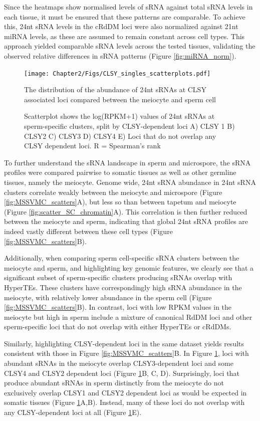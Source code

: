 Since the heatmaps show normalised levels of sRNA against total sRNA levels in each tissue, it must be ensured that these patterns are comparable. To achieve this, 24nt sRNA levels in the cRdDM loci were also normalized against 21nt miRNA levels, as these are assumed to remain constant across cell types. This approach yielded comparable sRNA levels across the tested tissues, validating the observed relative differences in sRNA patterns (Figure \ref{fig:miRNA_norm}).

\begin{figure}[htbp!] 
\centering    
    \texttt{[image: Chapter2/Figs/CLSY\_singles\_scatterplots.pdf]}
\caption{The distribution of the abundance of 24nt sRNAs at CLSY associated loci compared between the meiocyte and sperm cell}
\label{fig:clsysingle_scatters}
\captionsetup{font=small}
    \caption*{Scatterplot shows the log(RPKM+1) values of 24nt sRNAs at sperm-specific clusters, split by CLSY-dependent loci A) CLSY 1 B) CLSY2 C) CLSY3 D) CLSY4 E) Loci that do not overlap any CLSY dependent loci. R = Spearman's rank}
\end{figure}

To further understand the sRNA landscape in sperm and microspore, the sRNA profiles were compared pairwise to somatic tissues as well as other germline tissues, namely the meiocyte. Genome wide, 24nt sRNA abundance in 24nt sRNA clusters correlate weakly between the meiocyte and microspore (Figure \ref{fig:MSSVMC_scatters}A), but less so than between tapetum and meiocyte (Figure \ref{fig:scatter_SC_chromatin}A). This correlation is then further reduced between the meiocyte and sperm, indicating that global 24nt sRNA profiles are indeed vastly different between these cell types (Figure \ref{fig:MSSVMC_scatters}B).

Additionally, when comparing sperm cell-specific sRNA clusters between the meiocyte and sperm, and highlighting key genomic features, we clearly see that a significant subset of sperm-specific clusters producing sRNAs overlap with HyperTEs. These clusters have correspondingly high sRNA abundance in the meiocyte, with relatively lower abundance in the sperm cell (Figure \ref{fig:MSSVMC_scatters}B). In contrast, loci with low RPKM values in the meiocyte but high in sperm include a mixture of canonical RdDM loci and other sperm-specific loci that do not overlap with either HyperTEs or cRdDMs.

Similarly, highlighting CLSY-dependent loci in the same dataset  yields results consistent with those in Figure \ref{fig:MSSVMC_scatters}B. In Figure \ref{fig:clsysingle_scatters}, loci with abundant sRNAs in the meiocyte overlap CLSY3-dependent loci and some CLSY4 and CLSY2 dependent loci (Figure \ref{fig:clsysingle_scatters}B, C, D). Surprisingly, loci that produce abundant sRNAs in sperm distinctly from the meiocyte do not exclusively overlap CLSY1 and CLSY2 dependent loci as would be expected in somatic tissues (Figure \ref{fig:clsysingle_scatters}A,B). Instead, many of these loci do not overlap with any CLSY-dependent loci at all (Figure \ref{fig:clsysingle_scatters}E). 

